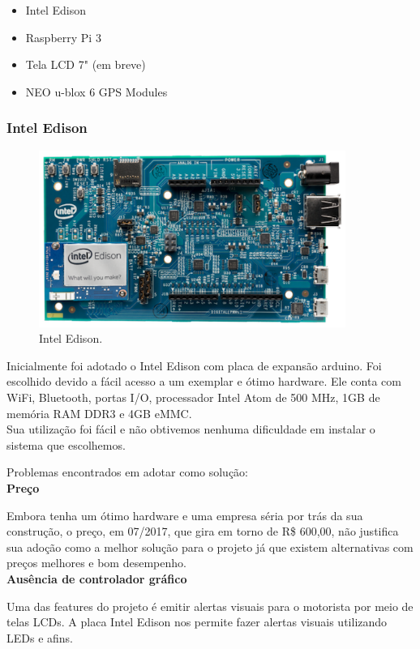 \documentclass[
	12pt,				%
	oneside,			%
	a4paper,			%
	brazil				%
]{abntex2}
\begin{document}
\begin{itemize}
\item Intel Edison
\item Raspberry Pi 3
\item Tela LCD 7" (em breve)
\item NEO u-blox 6 GPS Modules
\end{itemize}

\subsubsection{Intel Edison}

\begin{figure}[!h]
\centering
\includegraphics[width=10cm, center]{images/intel-edison-arduino-kit}
\caption{Intel Edison.}
\label{Rotulo}
\end{figure}

Inicialmente foi adotado o Intel Edison com placa de expansão arduino. Foi escolhido devido a fácil acesso a um exemplar e ótimo hardware. Ele conta com WiFi, Bluetooth, portas I/O, processador Intel Atom de 500 MHz, 1GB de memória RAM DDR3 e 4GB eMMC. \\
Sua utilização foi fácil e não obtivemos nenhuma dificuldade em instalar o sistema que escolhemos.


Problemas encontrados em adotar como solução:
\\

\textbf{Preço}

Embora tenha um ótimo hardware e uma empresa séria por trás da sua construção, o preço, em 07/2017, que gira em torno de R\$ 600,00, não justifica sua adoção como a melhor solução para o projeto já que existem alternativas com preços melhores e bom desempenho.
\\

\textbf{Ausência de controlador gráfico}

Uma das features do projeto é emitir alertas visuais para o motorista por meio de telas LCDs. A placa Intel Edison nos permite fazer alertas visuais utilizando LEDs e afins. 
\\
\end{document}
